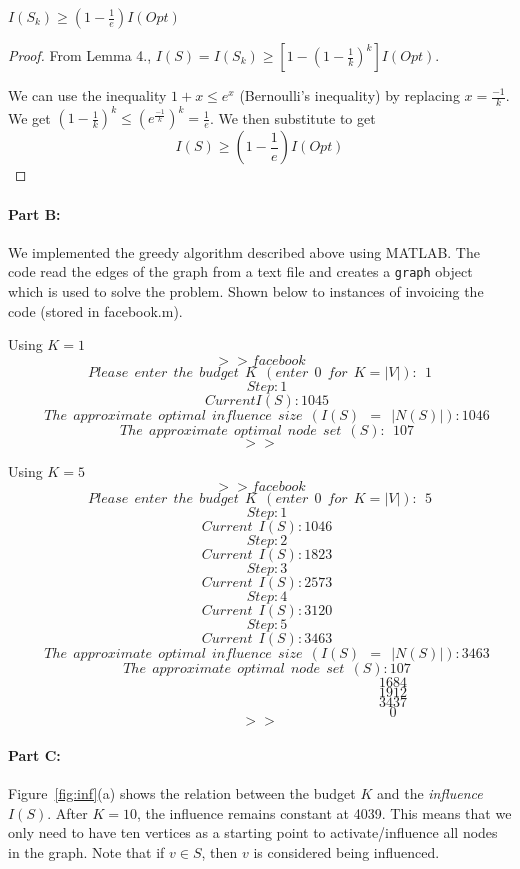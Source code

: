 \begin{lemma}
$I(S_{k})\geq (1-\frac{1}{e})I(Opt)$
\end{lemma}

\begin{proof}
From Lemma 4., $I(S) = I(S_{k}) \geq [1-(1-\frac{1}{k})^k]I(Opt)$. 

\noindent 
We can use the inequality $1+x\leq e^{x}$ (Bernoulli's inequality) by replacing $x=\frac{-1}{k}$. We get $\left(1-\frac{1}{k}\right)^{k}\leq \left( e^{\frac{-1}{k}} \right)^{k} = \frac{1}{e}$. We then substitute to get 
$$
I(S) \geq \left(1-\frac{1}{e}\right)I(Opt)
$$
\end{proof}


\paragraph{Part B:}
We implemented the greedy algorithm described above using MATLAB. The code read the edges of the graph from a text file and creates a \texttt{graph} object which is used to solve the problem. Shown below to instances of invoicing the code (stored in \textsf{facebook.m}).


Using  $K = 1$
\mathleft
\[
>> facebook
\]
\[
Please\ \ enter\ \ the\ \ budget\ \ K\ \ (enter\ \ 0\ \ for\ \ K=|V|):\ \ 1
\]
\[
\quad Step: 1
\]
\[
\quad Current I(S):1045
\]
\[
\quad The\ \ approximate\ \ optimal\ \ influence\ \ size\ \ (I(S)\ \ =\ \ |N(S)|): 1046
\]
\[
\quad The\ \ approximate\ \ optimal\ \ node\ \ set\ \ (S):\ \ 107
\]
\[
>>
\]

Using  $K = 5$
\mathleft
\[
>> facebook
\]
\[
Please\ \ enter\ \ the\ \ budget\ \ K\ \ (enter\ \ 0\ \ for\ \ K=|V|):\ \ 5
\]
\[
\quad Step: 1
\]
\[
\quad Current\ \ I(S):1046
\]
\[
\quad Step: 2
\]
\[
\quad Current\ \ I(S):1823
\]
\[
\quad Step: 3
\]
\[
\quad Current\ \ I(S):2573
\]
\[
\quad Step: 4
\]
\[
\quad Current\ \ I(S):3120
\]
\[
\quad Step: 5
\]
\[
\quad Current\ \ I(S):3463
\]
\[
\quad The\ \ approximate\ \ optimal\ \ influence\ \ size\ \ (I(S)\ \ =\ \ |N(S)|): 3463
\]
\[
\quad The\ \ approximate\ \ optimal\ \ node\ \ set\ \ (S): 107
\]
\[
\qquad \qquad \qquad \qquad \qquad \qquad \qquad \qquad \qquad \quad 1684
\]
\[
\qquad \qquad \qquad \qquad \qquad \qquad \qquad \qquad \qquad \quad 1912
\]
\[
\qquad \qquad \qquad \qquad \qquad \qquad \qquad \qquad \qquad \quad 3437
\]
\[
\qquad \qquad \qquad \qquad \qquad \qquad \qquad \qquad \qquad \quad 0
\]
\[
>>
\]
 



\paragraph{Part C:}
Figure~\ref{fig:inf}(a) shows the relation between the budget $K$ and the \emph{influence} $I(S)$. After $K=10$, the influence remains constant at 4039. This means that we only need to have ten vertices as a starting point to activate/influence all nodes in the graph. Note that if $v\in S$, then $v$ is considered being influenced. 

